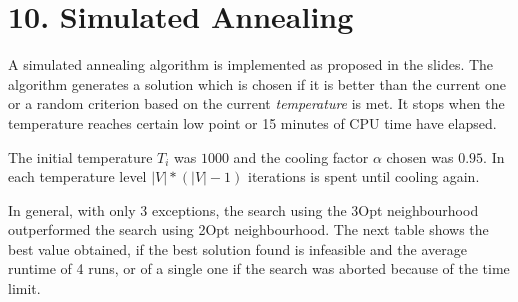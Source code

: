 \section*{10. Simulated Annealing}
A simulated annealing algorithm  is implemented as proposed in the slides. The algorithm generates a solution which is chosen if it is better than the current one or a random criterion based on the current \textit{temperature} is met. It stops when the temperature reaches certain low point or 15 minutes of CPU time have elapsed.

The initial temperature $ T_i $ was $ 1000 $ and the cooling factor $ \alpha $ chosen was $ 0.95 $. In each temperature level $ |V|*(|V|-1) $ iterations is spent until cooling again.

In general, with only 3 exceptions, the search using the 3Opt neighbourhood outperformed the search using 2Opt neighbourhood. The next table shows the best  value obtained, if the best solution found is infeasible and the average runtime of 4 runs, or of a single one if the search was aborted because of the time limit.
